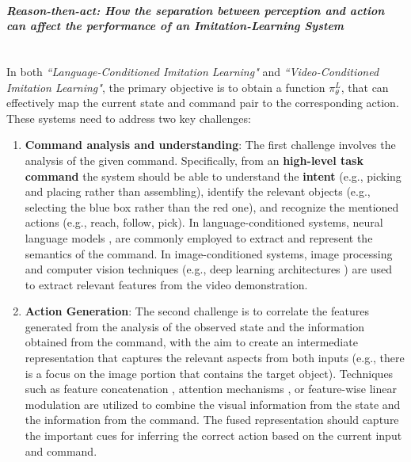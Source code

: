\paragraph{\textit{Reason-then-act: How the separation between perception and action can affect the performance of an Imitation-Learning System}} \mbox{} \\
In both \textit{``Language-Conditioned Imitation Learning"} and \textit{``Video-Conditioned Imitation Learning"}, the primary objective is to obtain a function $\pi_{\theta}^{L}$, that can effectively map the current state and command pair to the corresponding action. These systems need to address two key challenges:
\begin{enumerate}
    \item \textbf{Command analysis and understanding}: The first challenge involves the
          analysis of the given command. Specifically, from an \textbf{high-level task command} the system should be able to understand the \textbf{intent} (e.g., picking and placing rather than assembling), identify the relevant objects (e.g., selecting the blue box rather than the red one), and recognize the mentioned actions (e.g., reach, follow, pick). In language-conditioned systems, neural language models \cite{stepputtis2020language,jang2022bc_z,brohan2022rt}, are commonly employed to extract and represent the semantics of the command. In image-conditioned systems, image processing and computer vision techniques (e.g., deep learning architectures \cite{dasari2021transformers_one_shot,mandi2022towards_more_generalizable_one_shot}) are used to extract relevant features from the video demonstration.
    \item \textbf{Action Generation}: The second challenge is to correlate the features generated from the analysis of the observed state and the information obtained from the command, with the aim to create an intermediate representation that captures the relevant aspects from both inputs (e.g., there is a focus on the image portion that contains the target object). Techniques such as feature concatenation \cite{james2018task_embedded,stepputtis2020language,bhutani2022attentive_one_shot}, attention mechanisms \cite{dasari2021transformers_one_shot,mandi2022towards_more_generalizable_one_shot}, or feature-wise linear modulation \cite{brohan2022rt} are utilized to combine the visual information from the state and the information from the command. The fused representation should capture the important cues for inferring the correct action based on the current input and command.
\end{enumerate}
